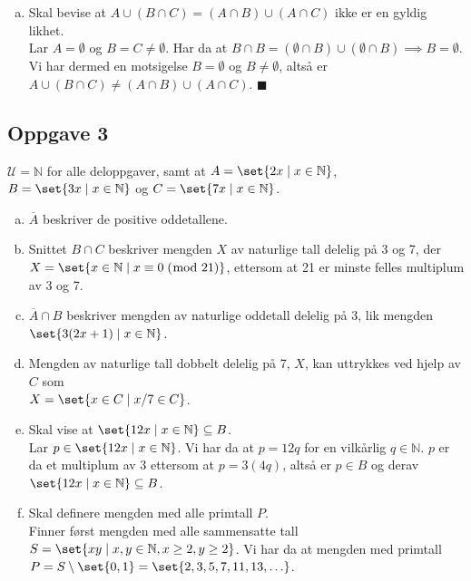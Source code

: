 \documentclass{article}
\begin{document}
\begin{enumerate}[(a)]
{        Altså er $(A \cap B) \cup (A \cap C) \subseteq A \cap (B \cup C)$. \\
        $A \cap (B \cup C) = (A \cap B) \cup (A \cap C)$. $\blacksquare$
    }
    \item {
        Skal bevise at $A \cup (B \cap C) = (A \cap B) \cup (A \cap C)$ ikke er en gyldig likhet. \\
        Lar $A = \emptyset$ og $B = C \neq \emptyset$. Har da at 
        $B \cap B = (\emptyset \cap B) \cup (\emptyset \cap B) \implies B = \emptyset$. Vi har dermed en motsigelse 
        $B = \emptyset$ og $B \neq \emptyset$, altså er $A \cup (B \cap C) \neq (A \cap B) \cup (A \cap C)$. $\blacksquare$
    }
\end{enumerate}

\subsection*{Oppgave 3}
$\mathcal{U} = \mathbb{N}$ for alle deloppgaver, samt at $A = \set{2x \mid x \in \mathbb{N}}$, $B = \set{3x \mid x \in \mathbb{N}}$ og $C = \set{7x \mid x \in \mathbb{N}}$. 
\begin{enumerate}[(a)]
    \item {
        $\overline{A}$ beskriver de positive oddetallene.
    }
    \item {
        Snittet $B \cap C$ beskriver mengden $X$ av naturlige tall delelig på 3 og 7, der \\ 
        $X = \set{x \in \mathbb{N} \mid x \equiv 0\;(\bmod{\;21})}$, ettersom at 21 er minste felles multiplum av 3 og 7.
    }
    \item {
        $\overline{A} \cap B$ beskriver mengden av naturlige oddetall delelig på 3, lik mengden $\set{3(2x + 1) \mid x \in \mathbb{N}}$.
    }
    \item {
        Mengden av naturlige tall dobbelt delelig på 7, $X$, kan uttrykkes ved hjelp av $C$ som \\
        $X = \set{x \in C \mid x/7 \in C}$. 
    }
    \item {
        Skal vise at $\set{12x \mid x \in \mathbb{N}} \subseteq B$. \\
        Lar $p \in \set{12x \mid x \in \mathbb{N}}$. Vi har da at $p = 12q$ for en vilkårlig $q \in \mathbb{N}$.
        $p$ er da et multiplum av 3 ettersom at $p = 3(4q)$, altså er $p \in B$ og derav $\set{12x \mid x \in \mathbb{N}} \subseteq B$.
    }
    \item {
        Skal definere mengden med alle primtall $P$. \\
        Finner først mengden med alle sammensatte tall $S = \set{xy \mid x,y \in \mathbb{N}, x \geq 2, y \geq 2}$.
        Vi har da at mengden med primtall $P = S \setminus \set{0, 1} = \set{2, 3, 5, 7, 11, 13, \ldots}$.
    }
\end{enumerate}
\end{document}
